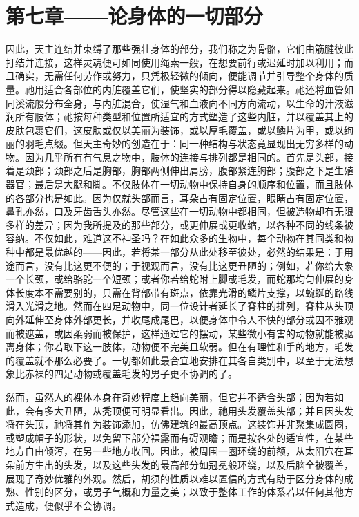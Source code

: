 
\section{第七章——论身体的一切部分}

因此，天主连结并束缚了那些强壮身体的部分，我们称之为骨骼，它们由筋腱彼此打结并连接，这样灵魂便可如同使用绳索一般，在想要前行或迟延时加以利用；而且确实，无需任何劳作或努力，只凭极轻微的倾向，便能调节并引导整个身体的质量。祂用适合各部位的内脏覆盖它们，使坚实的部分得以隐藏起来。祂还将血管如同溪流般分布全身，与内脏混合，使湿气和血液向不同方向流动，以生命的汁液滋润所有肢体；祂按每种类型和位置所适宜的方式塑造了这些内脏，并以覆盖其上的皮肤包裹它们，这皮肤或仅以美丽为装饰，或以厚毛覆盖，或以鳞片为甲，或以绚丽的羽毛点缀。但天主奇妙的创造在于：同一种结构与状态竟显现出无穷多样的动物。因为几乎所有有气息之物中，肢体的连接与排列都是相同的。首先是头部，接着是颈部；颈部之后是胸部，胸部两侧伸出肩膀，腹部紧连胸部；腹部之下是生殖器官；最后是大腿和脚。不仅肢体在一切动物中保持自身的顺序和位置，而且肢体的各部分也是如此。因为仅就头部而言，耳朵占有固定位置，眼睛占有固定位置，鼻孔亦然，口及牙齿舌头亦然。尽管这些在一切动物中都相同，但被造物却有无限多样的差异；因为我所提及的那些部分，或更伸展或更收缩，以各种不同的线条被容纳。不仅如此，难道这不神圣吗？在如此众多的生物中，每个动物在其同类和物种中都是最优越的——因此，若将某一部分从此处移至彼处，必然的结果是：于用途而言，没有比这更不便的；于视观而言，没有比这更丑陋的；例如，若你给大象一个长颈，或给骆驼一个短颈；或者你若给蛇附上脚或毛发，而蛇那均匀伸展的身体长度本不需要别的，只需在背部带有斑点，依靠光滑的鳞片支撑，以蜿蜒的路线滑入光滑之地。然而在四足动物中，同一位设计者延长了脊柱的排列，脊柱从头顶向外延伸至身体外部更长，并收尾成尾巴，以便身体中令人不快的部分或因不雅观而被遮盖，或因柔弱而被保护，这样通过它的摆动，某些微小有害的动物就能被驱离身体；你若取下这一肢体，动物便不完美且软弱。但在有理性和手的地方，毛发的覆盖就不那么必要了。一切都如此最合宜地安排在其各自类别中，以至于无法想象比赤裸的四足动物或覆盖毛发的男子更不协调的了。\par

然而，虽然人的裸体本身在奇妙程度上趋向美丽，但它并不适合头部；因为若如此，会有多大丑陋，从秃顶便可明显看出。因此，祂用头发覆盖头部；并且因头发将在头顶，祂将其作为装饰添加，仿佛建筑的最高顶点。这装饰并非聚集成圆圈，或塑成帽子的形状，以免留下部分裸露而有碍观瞻；而是按各处的适宜性，在某些地方自由倾泻，在另一些地方收回。因此，被周围一圈环绕的前额，从太阳穴在耳朵前方生出的头发，以及这些头发的最高部分如冠冕般环绕，以及后脑全被覆盖，展现了奇妙优雅的外观。然后，胡须的性质以难以置信的方式有助于区分身体的成熟、性别的区分，或男子气概和力量之美；以致于整体工作的体系若以任何其他方式造成，便似乎不会协调。\par

